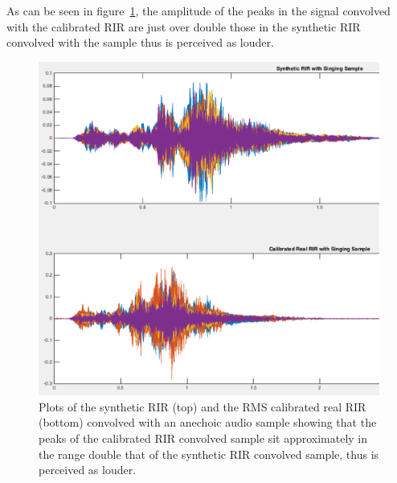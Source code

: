\documentclass[../../main.tex]{subfiles}
\begin{document}
			As can be seen in figure~\ref{calRMSsing}, the amplitude of the peaks in the signal convolved with the calibrated RIR are just over double those in the synthetic RIR convolved with the sample thus is perceived as louder.

			\begin{figure}[H]
				\begin{center}
					\includegraphics[scale = 0.3]{Sections/Implementation/RealRIRs/images/calibration/CalRMS_Sing_edit.png} 
					\caption{Plots of the synthetic \ac{RIR} (top) and the RMS calibrated real \ac{RIR} (bottom) convolved with an anechoic audio sample showing that the peaks of the calibrated \ac{RIR} convolved sample sit approximately in the range double that of the synthetic \ac{RIR} convolved sample, thus is perceived as louder.}
					\label{calRMSsing}
				\end{center}
			\end{figure}

\end{document}

